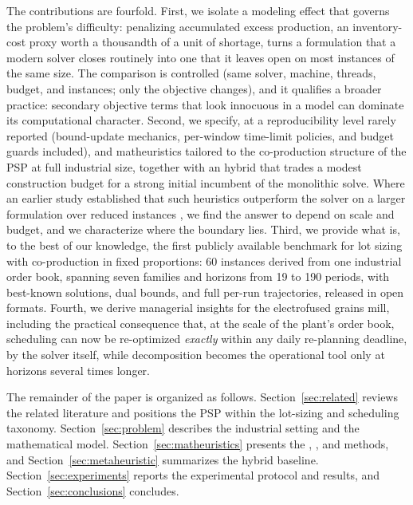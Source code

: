 The contributions are fourfold. First, we isolate a modeling effect
that governs the problem's difficulty: penalizing accumulated excess
production, an inventory-cost proxy worth a thousandth of a unit of
shortage, turns a formulation that a modern solver closes routinely
into one that it leaves open on most instances of the same size. The
comparison is controlled (same solver, machine, threads, budget, and
instances; only the objective changes), and it qualifies a broader
practice: secondary objective terms that look innocuous in a model can
dominate its computational character. Second, we specify, at a
reproducibility level rarely reported (bound-update mechanics,
per-window time-limit policies, and budget guards included), \RF{} and
\FO{} matheuristics tailored to the co-production structure of the PSP
at full industrial size, together with an \RFMIP{} hybrid that trades
a modest construction budget for a strong initial incumbent of the
monolithic solve. Where an earlier study established that such
heuristics outperform the solver on a larger formulation over reduced
instances \citep{villasboas2021modeling}, we find the answer to
depend on scale and budget, and we characterize where the boundary
lies. Third, we
provide what is, to the best of our knowledge, the first publicly
available benchmark for lot sizing with co-production in fixed
proportions: 60 instances derived from one industrial order book,
spanning seven families and horizons from 19 to 190 periods, with
best-known solutions, dual bounds, and full per-run trajectories,
released in open formats. Fourth, we derive managerial insights for the
electrofused grains mill, including the practical consequence that,
at the scale of the plant's order book, scheduling can now be
re-optimized \emph{exactly} within any daily re-planning deadline, by the solver itself, while decomposition becomes the operational
tool only at horizons several times longer.

The remainder of the paper is organized as follows.
Section~\ref{sec:related} reviews the related literature and positions
the PSP within the lot-sizing and scheduling taxonomy.
Section~\ref{sec:problem} describes the industrial setting and the
mathematical model. Section~\ref{sec:matheuristics} presents the
\RF{}, \FO{}, and \RFMIP{} methods, and
Section~\ref{sec:metaheuristic} summarizes the hybrid \ILS{} baseline.
Section~\ref{sec:experiments} reports the experimental protocol and
results, and Section~\ref{sec:conclusions} concludes.
